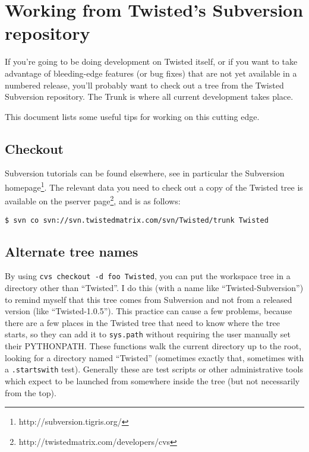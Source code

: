 \section{Working from Twisted's Subversion repository\label{doc/howto/policy/svn-dev.xhtml}}


If you're going to be doing development on Twisted itself, or if you want to take advantage of bleeding-edge features (or bug fixes) that are not yet available in a numbered release, you'll probably want to check out a tree from the Twisted Subversion repository. The Trunk is where all current development takes place.

This document lists some useful tips for working on this cutting edge.

\subsection{Checkout}


Subversion tutorials can be found elsewhere, see in particular the Subversion homepage\footnote{http://subversion.tigris.org/}. The relevant data you need to check out a copy of the Twisted tree is available on the pserver page\footnote{http://twistedmatrix.com/developers/cvs}, and is as follows:\begin{verbatim}
$ svn co svn://svn.twistedmatrix.com/svn/Twisted/trunk Twisted
\end{verbatim}


\subsection{Alternate tree names}


By using \texttt{cvs checkout -d foo Twisted}, you can put the workspace tree in a directory other than ``Twisted''. I do this (with a name like ``Twisted-Subversion'') to remind myself that this tree comes from Subversion and not from a released version (like ``Twisted-1.0.5''). This practice can cause a few problems, because there are a few places in the Twisted tree that need to know where the tree starts, so they can add it to \texttt{sys.\linebreak[1]path} without requiring the user manually set their PYTHONPATH. These functions walk the current directory up to the root, looking for a directory named ``Twisted'' (sometimes exactly that, sometimes with a \texttt{.startswith} test). Generally these are test scripts or other administrative tools which expect to be launched from somewhere inside the tree (but not necessarily from the top).

